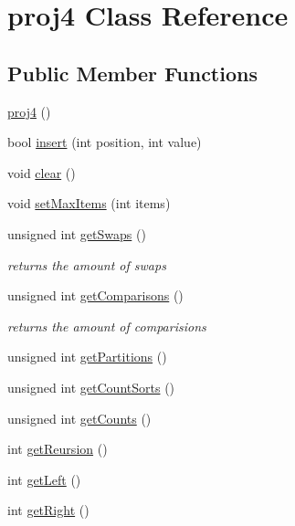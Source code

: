 \hypertarget{classproj4}{}\section{proj4 Class Reference}
\label{classproj4}
\subsection*{Public Member Functions}
\begin{DoxyCompactItemize}
\item 
\mbox{\hyperlink{classproj4_ac880083cdde0f8b74520224be0d66085}{proj4}} ()
\item 
bool \mbox{\hyperlink{classproj4_ac11ae7e2ea8ae9432a6ed87a458c1bd5}{insert}} (int position, int value)
\item 
void \mbox{\hyperlink{classproj4_a6a830cb16e2252128616906c345429dd}{clear}} ()
\item 
void \mbox{\hyperlink{classproj4_aa7a82d6f979a7d11fdff535b1329ac79}{set\+Max\+Items}} (int items)
\item 
unsigned int \mbox{\hyperlink{classproj4_a0a8c2239f67a3b980e0c3ce7d30bc49e}{get\+Swaps}} ()
\begin{DoxyCompactList}\small\item\em returns the amount of swaps \end{DoxyCompactList}\item 
unsigned int \mbox{\hyperlink{classproj4_a0f93bf202146d4965668daaf5ffc1b1b}{get\+Comparisons}} ()
\begin{DoxyCompactList}\small\item\em returns the amount of comparisions \end{DoxyCompactList}\item 
unsigned int \mbox{\hyperlink{classproj4_ac923b04f0a279f04b89220b4f33973de}{get\+Partitions}} ()
\item 
unsigned int \mbox{\hyperlink{classproj4_a8780450f397cf30384a2eb41d3a24df7}{get\+Count\+Sorts}} ()
\item 
unsigned int \mbox{\hyperlink{classproj4_ac80a9cc8bf6fdd000a6515fd63070371}{get\+Counts}} ()
\item 
int \mbox{\hyperlink{classproj4_a3ba29a2c458a27e34577ef383bcf7df2}{get\+Reursion}} ()
\item 
int \mbox{\hyperlink{classproj4_a58e2adfdc732a2533990ad44bc75f1d8}{get\+Left}} ()
\item 
int \mbox{\hyperlink{classproj4_a83d1387e419d934fa5b97e2f79b979d2}{get\+Right}} ()
\item 

\end{DoxyCompactItemize}
